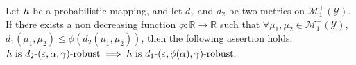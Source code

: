 
 
 


\begin{lemma}
\label{th::PropimpliesRobustness}Let $h$ be a probabilistic mapping, and
let  $d_{1}$ and $d_{2}$ be two metrics on $\mathcal{M}_1^+(\mathcal{Y})$.
If there exists a non decreasing function $ \phi: \mathbb{R} \to \mathbb{R}$ such that  $\forall \mu_1,\mu_2 \in \mathcal{M}_1^+(\mathcal{Y})$, $d_{1}(\mu_1,\mu_2) \leq \phi(d_{2}(\mu_1,\mu_2)) $, then the following assertion holds: 
$h \text{ is } d_{2}\text{-}(\varepsilon, \alpha, \gamma)\text{-robust} \implies h \text{ is }d_{1}\text{-}(\varepsilon, \phi(\alpha), \gamma)\text{-robust}.$
\end{lemma}

